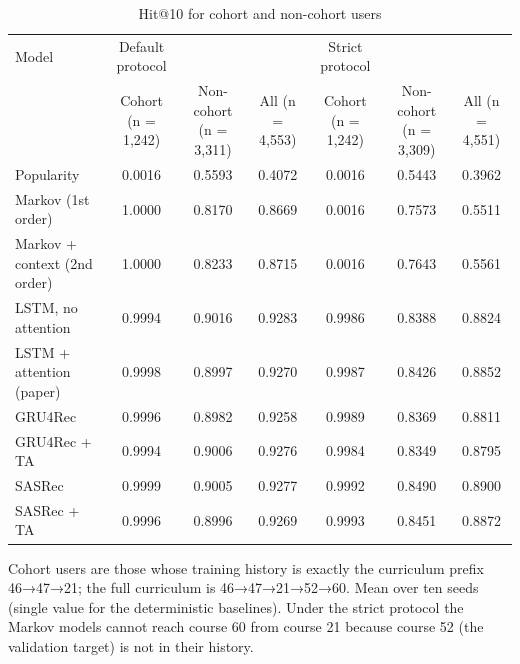\begin{table}[t]\centering\footnotesize
\caption{Hit@10 for cohort and non-cohort users}
\begin{tabular}{lcccccc}\toprule
Model & Default protocol &  &  & Strict protocol &  &  \\
 & Cohort (n = 1,242) & Non-cohort (n = 3,311) & All (n = 4,553) & Cohort (n = 1,242) & Non-cohort (n = 3,309) & All (n = 4,551) \\
\midrule
Popularity & 0.0016 & 0.5593 & 0.4072 & 0.0016 & 0.5443 & 0.3962 \\
Markov (1st order) & 1.0000 & 0.8170 & 0.8669 & 0.0016 & 0.7573 & 0.5511 \\
Markov + context (2nd order) & 1.0000 & 0.8233 & 0.8715 & 0.0016 & 0.7643 & 0.5561 \\
LSTM, no attention & 0.9994 & 0.9016 & 0.9283 & 0.9986 & 0.8388 & 0.8824 \\
LSTM + attention (paper) & 0.9998 & 0.8997 & 0.9270 & 0.9987 & 0.8426 & 0.8852 \\
GRU4Rec & 0.9996 & 0.8982 & 0.9258 & 0.9989 & 0.8369 & 0.8811 \\
GRU4Rec + TA & 0.9994 & 0.9006 & 0.9276 & 0.9984 & 0.8349 & 0.8795 \\
SASRec & 0.9999 & 0.9005 & 0.9277 & 0.9992 & 0.8490 & 0.8900 \\
SASRec + TA & 0.9996 & 0.8996 & 0.9269 & 0.9993 & 0.8451 & 0.8872 \\
\bottomrule
\end{tabular}
\par\smallskip\footnotesize Cohort users are those whose training history is exactly the curriculum prefix 46→47→21; the full curriculum is 46→47→21→52→60. Mean over ten seeds (single value for the deterministic baselines). Under the strict protocol the Markov models cannot reach course 60 from course 21 because course 52 (the validation target) is not in their history.
\end{table}